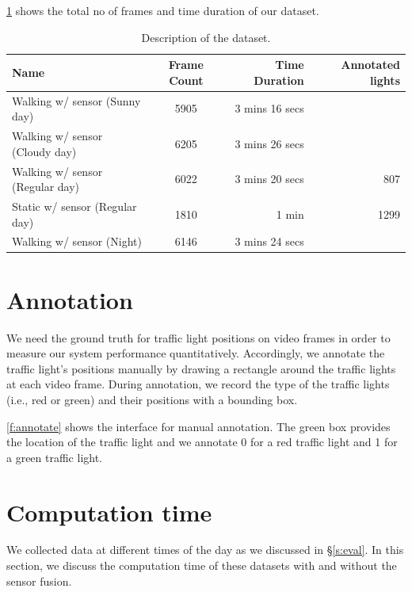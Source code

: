 \ref{t:dataset} shows the total no of frames and time duration of our dataset.

\begin{table}[ht!]
  \centering
  \caption{Description of the dataset.}
  \label{t:dataset}
  \begin{tabular}{  l  c  r r }
    \rowcolor{gray!50}
    Name & Frame Count & Time Duration & Annotated lights\\
    \hline
    Walking w/ sensor (Sunny day) & 5905 & 3 mins 16 secs &   \\
    Walking w/ sensor (Cloudy day) & 6205 & 3 mins 26 secs & \\
    Walking w/ sensor (Regular day) & 6022 & 3 mins 20 secs & 807\\
    Static w/ sensor (Regular day) & 1810 & 1 min & 1299\\
    Walking w/ sensor (Night) & 6146 & 3 mins 24 secs \\
    \hline
  \end{tabular}
\end{table}

\section{Annotation}
We need the ground truth for traffic light positions on video frames in order to measure our system performance quantitatively.
Accordingly, we annotate the traffic light's positions manually by drawing a rectangle around the traffic lights at each video frame.
During annotation, we record the type of the traffic lights (i.e., red or green) and their positions with a bounding box.

\ref{f:annotate} shows the interface for manual annotation.
The green box provides the location of the traffic light and we annotate 0 for a red traffic light and 1 for a green traffic light.




\section{Computation time}
We collected data at different times of the day as we discussed in \S\ref{s:eval}.
In this section, we discuss the computation time of these datasets with and without the sensor fusion.

